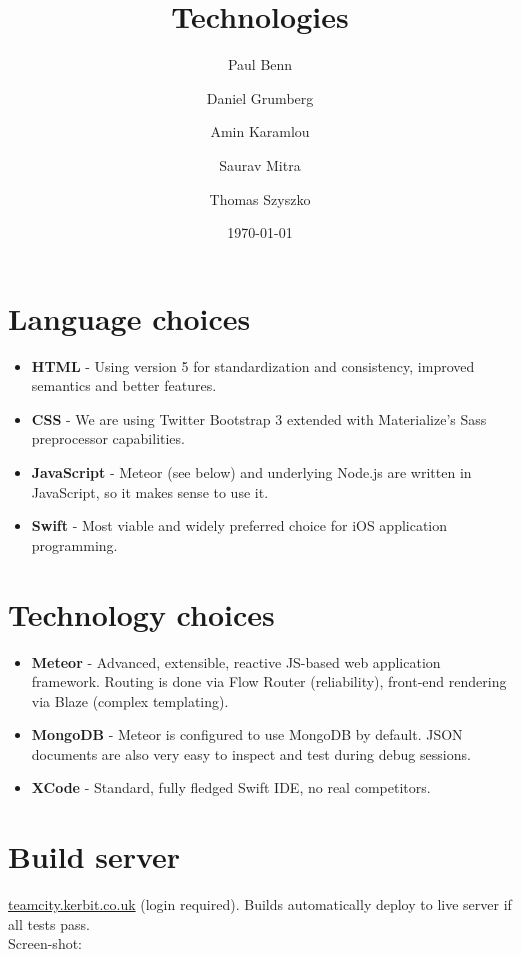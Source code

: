 \documentclass[a4wide, 11pt]{article}
\begin{document}
\title{Technologies}

\author{Paul Benn \and Daniel Grumberg \and Amin Karamlou \and Saurav Mitra \and Thomas Szyszko }

\date{\today}


\clearpage

\section{Language choices}

\begin{itemize}
	\item \textbf{HTML} - Using version 5 for standardization and consistency, improved semantics and better features.
	\item \textbf{CSS} - We are using Twitter Bootstrap 3 extended with Materialize's Sass preprocessor capabilities.
	\item \textbf{JavaScript} - Meteor (see below) and underlying Node.js are written in JavaScript, so it makes sense to use it.
	\item \textbf{Swift} - Most viable and widely preferred choice for iOS application programming.
\end{itemize}

\section{Technology choices}

\begin{itemize}
	\item \textbf{Meteor} - Advanced, extensible, reactive JS-based web application framework. Routing is done via Flow Router (reliability), front-end rendering via Blaze (complex templating).
	\item \textbf{MongoDB} - Meteor is configured to use MongoDB by default. JSON documents are also very easy to inspect and test during debug sessions.
	\item \textbf{XCode} - Standard, fully fledged Swift IDE, no real competitors.
\end{itemize}

\section{Build server}

\url{teamcity.kerbit.co.uk} (login required). Builds automatically deploy to live server if all tests pass.\\
Screen-shot:
\end{document}
